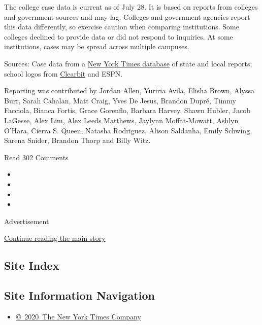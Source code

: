 The college case data is current as of July 28. It is based on reports
from colleges and government sources and may lag. Colleges and
government agencies report this data differently, so exercise caution
when comparing institutions. Some colleges declined to provide data or
did not respond to inquiries. At some institutions, cases may be spread
across multiple campuses.

Sources: Case data from a
\href{https://www.nytimes3xbfgragh.onion/interactive/2020/us/coronavirus-us-cases.html}{New
York Times database} of state and local reports; school logos from
\href{https://clearbit.com}{Clearbit} and ESPN.

Reporting was contributed by Jordan Allen, Yuriria Avila, Elisha Brown,
Alyssa Burr, Sarah Cahalan, Matt Craig, Yves De Jesus, Brandon Dupré,
Timmy Facciola, Bianca Fortis, Grace Gorenflo, Barbara Harvey, Shawn
Hubler, Jacob LaGesse, Alex Lim, Alex Leeds Matthews, Jaylynn
Moffat-Mowatt, Ashlyn O'Hara, Cierra S. Queen, Natasha Rodriguez, Alison
Saldanha, Emily Schwing, Sarena Snider, Brandon Thorp and Billy Witz.

Read 302 Comments

\begin{itemize}
\item
\item
\item
\item
\end{itemize}

Advertisement

\protect\hyperlink{after-bottom}{Continue reading the main story}

\hypertarget{site-index}{%
\subsection{Site Index}\label{site-index}}

\hypertarget{site-information-navigation}{%
\subsection{Site Information
Navigation}\label{site-information-navigation}}

\begin{itemize}
\tightlist
\item
  \href{https://help.nytimes3xbfgragh.onion/hc/en-us/articles/115014792127-Copyright-notice}{©~2020~The
  New York Times Company}
\end{itemize}

